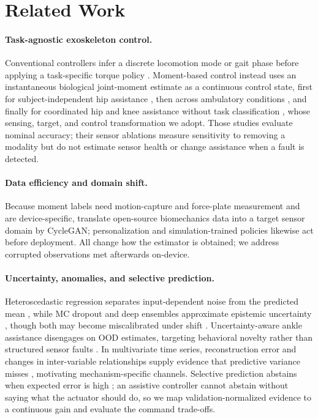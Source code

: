 \documentclass[letterpaper]{article} %
\begin{document}
\section{Related Work}

\paragraph{Task-agnostic exoskeleton control.}
Conventional controllers infer a discrete locomotion mode or gait phase before applying a task-specific torque policy \citep{camargo2021classification,kang2022classification}.
Moment-based control instead uses an instantaneous biological joint-moment estimate as a continuous control state, first for subject-independent hip assistance \citep{shepherd2022deep,molinaro2022hip}, then across ambulatory conditions \citep{molinaro2024unifies}, and finally for coordinated hip and knee assistance without task classification \citep{molinaro2024task}, whose sensing, target, and control transformation we adopt. Those studies evaluate nominal accuracy; their sensor ablations measure sensitivity to removing a modality but do not estimate sensor health or change assistance when a fault is detected.

\paragraph{Data efficiency and domain shift.}
Because moment labels need motion-capture and force-plate measurement and are device-specific, \citet{scherpereel2025domain} translate open-source biomechanics data into a target sensor domain by CycleGAN; personalization \citep{zhang2017humanloop,slade2022personalizing} and simulation-trained policies \citep{luo2024simulation} likewise act before deployment. All change how the estimator is obtained; we address corrupted observations met afterwards on-device.

\paragraph{Uncertainty, anomalies, and selective prediction.}
Heteroscedastic regression separates input-dependent noise from the predicted mean \citep{kendall2017uncertainties}, while MC dropout and deep ensembles approximate epistemic uncertainty \citep{gal2016dropout,lakshminarayanan2017ensembles}, though both may become miscalibrated under shift \citep{ovadia2019trust}.
Uncertainty-aware ankle assistance disengages on OOD estimates, targeting behavioral novelty rather than structured sensor faults \citep{tourk2025uncertainty}. In multivariate time series, reconstruction error and changes in inter-variable relationships supply evidence that predictive variance misses \citep{song2023memto,dai2024sarad}, motivating mechanism-specific channels. Selective prediction abstains when expected error is high \citep{geifman2019selectivenet}; an assistive controller cannot abstain without saying what the actuator should do, so we map validation-normalized evidence to a continuous gain and evaluate the command trade-offs.
\end{document}

